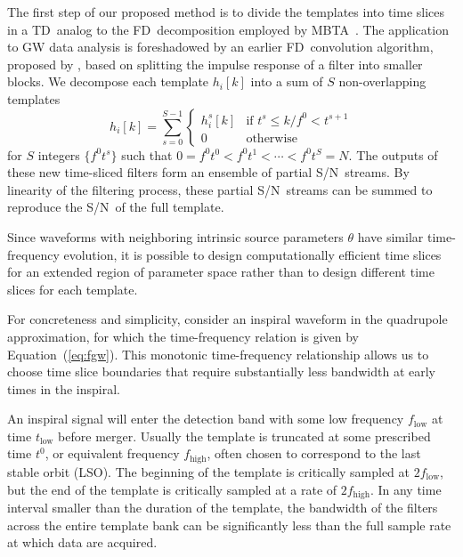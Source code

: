 \documentclass[preprint2]{aastex}
\newcommand{\LSO}{LSO}%
\newcommand{\SNR}{S/N}%
\newcommand{\TD}{TD}%
\newcommand{\FD}{FD}%
\begin{document}
The first step of our proposed method is to divide the templates into time
slices in a \TD\ analog to the \FD\ decomposition employed by MBTA~\citep{Marion2004,Buskulic2010}.  The application to GW data analysis is foreshadowed by an earlier \FD\ convolution algorithm, proposed by \citet{gardner1995efficient}, based on splitting the impulse response of a filter into smaller blocks.  We decompose each template
$h_{i}[k]$ into a sum of $S$ non-overlapping templates
%
\begin{equation}
\label{eq:time-slices}
h_{i}[k] = \sum_{s=0}^{S-1}
	\begin{cases}
		h_i^s[k] & \textrm{if } t^s \leqslant k / f^0 < t^{s+1} \\
		0 & \textrm{otherwise}
	\end{cases}
\end{equation}
%
for $S$ integers $\{f^0 t^s\}$ such that $0  = f^0 t^0 < f^0 t^1 < \cdots < f^0
t^S = N$.  The outputs of these new time-sliced filters
form an ensemble of partial \SNR\ streams.  By linearity of the filtering
process, these partial \SNR\ streams can be summed to reproduce the
\SNR\ of the full template.

Since waveforms with neighboring intrinsic source parameters $\theta$
 have similar time-frequency evolution, it is possible to design computationally
efficient time slices for an extended region of parameter space rather than to
design different time slices for each template.

For concreteness and simplicity, consider an inspiral waveform in the
quadrupole approximation, for which the time-frequency relation is given by Equation~(\ref{eq:fgw}).
This monotonic time-frequency relationship allows us
to choose time slice boundaries that require substantially less bandwidth at
early times in the inspiral.

An inspiral signal will enter the detection band with some low frequency
$f_\mathrm{low}$ at time $t_\mathrm{low}$ before merger.  Usually the template
is truncated at some prescribed time $t^0$, or equivalent frequency $f_\mathrm{high}$,
often chosen to correspond to the last stable orbit (\LSO). The beginning of the template is critically
sampled at $2 f_\mathrm{low}$, but the end of the template is critically sampled at a
rate of $2 f_\mathrm{high}$. In any time interval smaller than the duration of the template,
the bandwidth of the filters across the entire template bank can be significantly less
than the full sample rate at which data are acquired.
\end{document}
